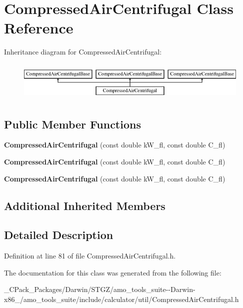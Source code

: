 \hypertarget{class_compressed_air_centrifugal}{}\section{Compressed\+Air\+Centrifugal Class Reference}
\label{class_compressed_air_centrifugal}
Inheritance diagram for Compressed\+Air\+Centrifugal\+:\begin{figure}[H]
\begin{center}
\leavevmode
\includegraphics[height=1.895093cm]{da/d25/class_compressed_air_centrifugal}
\end{center}
\end{figure}
\subsection*{Public Member Functions}
\begin{DoxyCompactItemize}
\item 
\mbox{\label{class_compressed_air_centrifugal_ae8a5a5532da3541881067d4002c9bfec}} 
{\bfseries Compressed\+Air\+Centrifugal} (const double k\+W\+\_\+fl, const double C\+\_\+fl)
\item 
\mbox{\label{class_compressed_air_centrifugal_ae8a5a5532da3541881067d4002c9bfec}} 
{\bfseries Compressed\+Air\+Centrifugal} (const double k\+W\+\_\+fl, const double C\+\_\+fl)
\item 
\mbox{\label{class_compressed_air_centrifugal_ae8a5a5532da3541881067d4002c9bfec}} 
{\bfseries Compressed\+Air\+Centrifugal} (const double k\+W\+\_\+fl, const double C\+\_\+fl)
\end{DoxyCompactItemize}
\subsection*{Additional Inherited Members}


\subsection{Detailed Description}


Definition at line 81 of file Compressed\+Air\+Centrifugal.\+h.



The documentation for this class was generated from the following file\+:\begin{DoxyCompactItemize}
\item 
\+\_\+\+C\+Pack\+\_\+\+Packages/\+Darwin/\+S\+T\+G\+Z/amo\+\_\+tools\+\_\+suite-\/-\/\+Darwin-\/x86\+\_/amo\+\_\+tools\+\_\+suite/include/calculator/util/Compressed\+Air\+Centrifugal.\+h\end{DoxyCompactItemize}

